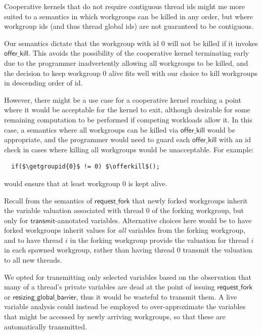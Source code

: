 \documentclass[sigconf]{acmart}
\newcommand{\transmit}{\mathsf{transmit}}
\newcommand{\offerfork}{\mathsf{request\_fork}}
\newcommand{\offerkill}{\mathsf{offer\_kill}}
\newcommand{\resizingglobalbarrier}{\mathsf{resizing\_global\_barrier}}
\newcommand{\getgroupid}{\mathsf{get\_group\_id}}
\begin{document}
{Cooperative kernels that do not require contiguous thread ids might me
more suited to a semantics in which workgroups can be killed in any
order, but where workgroup ids (and thus thread global ids) are not
guaranteed to be contiguous.

%
Our semantics dictate that the workgroup with id 0 will not be killed
if it invokes $\offerkill$.  This avoids the possibility of the
cooperative kernel terminating early due to the programmer
inadvertently allowing all workgroups to be killed, and the decision
to keep workgroup 0 alive fits well with our choice to kill workgroups
in descending order of id.

However, there might be a use case for a cooperative kernel reaching a
point where it would be acceptable for the kernel to exit, although
desirable for some remaining computation to be performed if competing
workloads allow it.  In this case, a semantics where all workgroups can be killed via $\offerkill$ would be appropriate, and the programmer would need to guard each $\offerkill$ with an id check in cases where killing all workgroups would be unacceptable.  For example:
%
\lstset{basicstyle=\tt,numbers=none}
\begin{lstlisting}
  if($\getgroupid{0}$ != 0) $\offerkill$();
\end{lstlisting}
\lstset{basicstyle=\scriptsize\tt,numbers=left}
%
would ensure that at least workgroup 0 is kept alive.

%
Recall from the semantics of $\offerfork$ that newly forked workgroups
inherit the variable valuation associated with thread 0 of the forking
workgroup, but only for $\transmit$-annotated variables.  Alternative
choices here would be to have forked workgroups inherit values for
\emph{all} variables from the forking workgroup, and to have thread
$i$ in the forking workgroup provide the valuation for thread $i$ in
each spawned workgroup, rather than having thread 0 transmit the
valuation to all new threads.

We opted for transmitting only selected variables based on the
observation that many of a thread's private variables are dead at the
point of issuing $\offerfork$ or $\resizingglobalbarrier$, thus it
would be wasteful to transmit them.  A live variable analysis could
instead be employed to over-approximate the variables that might be
accessed by newly arriving workgroups, so that these are automatically
transmitted.

}
\end{document}
